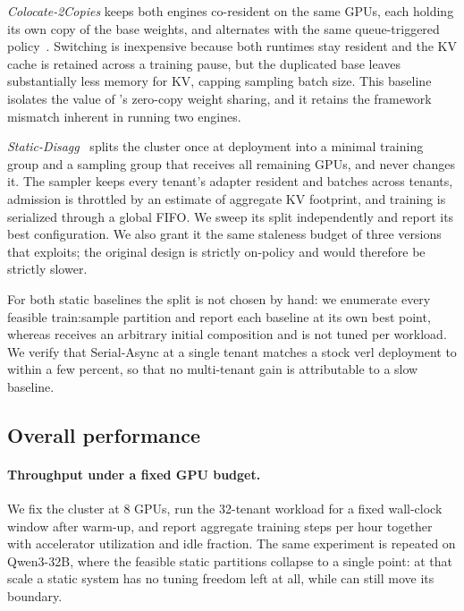 \emph{Colocate-2Copies} keeps both engines co-resident on the same GPUs, each holding its
own copy of the base weights, and alternates with the same queue-triggered
policy~\cite{verlhybridflow}. Switching is inexpensive because both runtimes stay
resident and the KV cache is retained across a training pause, but the duplicated base
leaves substantially less memory for KV, capping sampling batch size. This baseline
isolates the value of \sysname's zero-copy weight sharing, and it retains the framework
mismatch inherent in running two engines.

\emph{Static-Disagg}~\cite{yu2026marlaasmultitenantasynchronousreinforcement} splits the
cluster once at deployment into a minimal training group and a sampling group that
receives all remaining GPUs, and never changes it. The sampler keeps every tenant's
adapter resident and batches across tenants, admission is throttled by an estimate of
aggregate KV footprint, and training is serialized through a global FIFO. We sweep its
split independently and report its best configuration. We also grant it the same
staleness budget of three versions that \sysname exploits; the original design is
strictly on-policy and would therefore be strictly slower.

For both static baselines the split is not chosen by hand: we enumerate every feasible
train:sample partition and report each baseline at its own best point, whereas \sysname
receives an arbitrary initial composition and is not tuned per workload. We verify that
Serial-Async at a single tenant matches a stock verl deployment to within a few percent,
so that no multi-tenant gain is attributable to a slow baseline.

\subsection{Overall performance}

\paragraph{Throughput under a fixed GPU budget.} We fix the cluster at 8 GPUs, run the
32-tenant workload for a fixed wall-clock window after warm-up, and report aggregate
training steps per hour together with accelerator utilization and idle fraction.
 The same experiment is repeated on
Qwen3-32B, where the feasible static partitions collapse to a single point: at that
scale a static system has no tuning freedom left at all, while \sysname can still move
its boundary.

